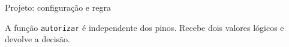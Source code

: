 \begin{frame}[fragile,t]{Projeto: configuração e regra}

\small A função \texttt{autorizar} é independente dos pinos. Recebe dois valores lógicos e devolve a decisão.
\end{frame}

